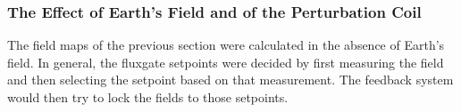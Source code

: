 
% 





\subsubsection{The Effect of Earth's Field and of the Perturbation Coil}

The field maps of the previous section were calculated in the absence
of Earth's field.  In general, the fluxgate setpoints were decided by
first measuring the field and then selecting the setpoint based on
that measurement.  The feedback system would then try to lock the
fields to those setpoints.

